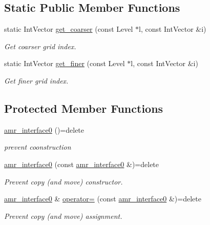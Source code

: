 \subsection*{Static Public Member Functions}
\begin{DoxyCompactItemize}
\item 
static Int\+Vector \hyperlink{classUintah_1_1PhaseField_1_1detail_1_1amr__interface0_3_01CC_01_4_a54ea40a0a051b55ff5c7a07895e1bba1}{get\+\_\+coarser} (const Level $\ast$l, const Int\+Vector \&i)
\begin{DoxyCompactList}\small\item\em Get coarser grid index. \end{DoxyCompactList}\item 
static Int\+Vector \hyperlink{classUintah_1_1PhaseField_1_1detail_1_1amr__interface0_3_01CC_01_4_a04ebe7c5eb56f351c20353fe93a09e3a}{get\+\_\+finer} (const Level $\ast$l, const Int\+Vector \&i)
\begin{DoxyCompactList}\small\item\em Get finer grid index. \end{DoxyCompactList}\end{DoxyCompactItemize}
\subsection*{Protected Member Functions}
\begin{DoxyCompactItemize}
\item 
\hyperlink{classUintah_1_1PhaseField_1_1detail_1_1amr__interface0_3_01CC_01_4_a54940842b4b34735b6181a3e66efd7c4}{amr\+\_\+interface0} ()=delete
\begin{DoxyCompactList}\small\item\em prevent coonstruction \end{DoxyCompactList}\item 
\hyperlink{classUintah_1_1PhaseField_1_1detail_1_1amr__interface0_3_01CC_01_4_a64f385463bfd52462ed9babaf56aea35}{amr\+\_\+interface0} (const \hyperlink{classUintah_1_1PhaseField_1_1detail_1_1amr__interface0}{amr\+\_\+interface0} \&)=delete
\begin{DoxyCompactList}\small\item\em Prevent copy (and move) constructor. \end{DoxyCompactList}\item 
\hyperlink{classUintah_1_1PhaseField_1_1detail_1_1amr__interface0}{amr\+\_\+interface0} \& \hyperlink{classUintah_1_1PhaseField_1_1detail_1_1amr__interface0_3_01CC_01_4_a31ce6d17e902abe712165f395a8d1ffb}{operator=} (const \hyperlink{classUintah_1_1PhaseField_1_1detail_1_1amr__interface0}{amr\+\_\+interface0} \&)=delete
\begin{DoxyCompactList}\small\item\em Prevent copy (and move) assignment. \end{DoxyCompactList}\end{DoxyCompactItemize}


